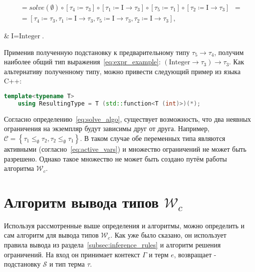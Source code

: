 \begin{equation}
\begin{aligned}
        &= solve(\emptyset)                                                                                                                                      \circ \left[ \tau_4 \coloneqq \tau_3 \right] \circ \left[ \tau_1 \coloneqq \text{I} \to \tau_3 \right] \circ \left[ \tau_5 \coloneqq \tau_1 \right] \circ \left[ \tau_2 \coloneqq \text{I} \to \tau_3 \right] &= \\
        &= \left[ \tau_4 \coloneqq \tau_3, \tau_1 \coloneqq \text{I} \to \tau_3, \tau_5 \coloneqq \text{I} \to \tau_3, \tau_2 \coloneqq \text{I} \to \tau_3 \right],
    \end{aligned}
\end{equation}
\begin{eqrem}
    &$\text{I} = \text{Integer}$.\\
\end{eqrem}

Применив полученную подстановку к предварительному типу $\tau_5 \to \tau_4$, получим наиболее общий тип выражения~\ref{eq:expr_example}: $(\text{Integer} \to \tau_3) \to \tau_3$.
Как альтернативу полученному типу, можно привести следующий пример из языка C++:

\begin{lstlisting}[label={lst:type_example},language=C++,caption={Вид полученного типа с точки зрения языка C++.}]
    template<typename T>
    using ResultingType = T (std::function<T (int)>)(*);
\end{lstlisting}

Согласно определению~\ref{eq:solve_algo}, существует возможность, что два неявных ограничения на экземпляр будут зависимы друг от друга.
Например, $\mathcal{C} = \left\{ \tau_1 \leq_{\emptyset} \tau_2, \tau_2 \leq_{\emptyset} \tau_1 \right\}$.
В таком случае обе переменных типа являются активными (согласно~\ref{eq:active_vars}) и множество ограничений не может быть разрешено.
Однако такое множество не может быть создано путём работы алгоритма $\mathcal{W}_c$.

\section{Алгоритм вывода типов $\mathcal{W}_c$}
\label{sec:inference_algo}

Используя рассмотренные выше определения и алгоритмы, можно определить и сам алгоритм для вывода типов $\mathcal{W}_c$.
Как уже было сказано, он использует правила вывода из раздела~\ref{subsec:inference_rules} и алгоритм решения ограничений.
На вход он принимает контекст $\Gamma$ и терм $e$, возвращает - подстановку $\mathcal{S}$ и тип терма $\tau$.

